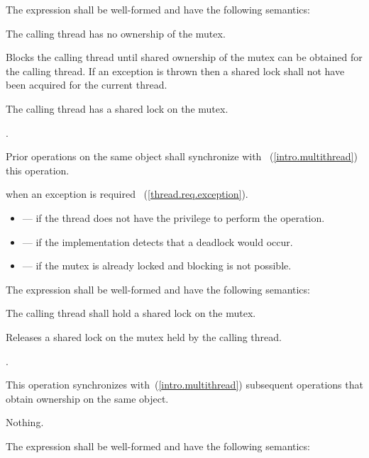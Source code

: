 \pnum
The expression  shall be well-formed and have the
following semantics:

\begin{itemdescr}
\pnum
\requires The calling thread has no ownership of the mutex.

\pnum
\effects Blocks the calling thread until shared ownership of the mutex can be obtained for the calling thread.
If an exception is thrown then a shared lock shall not have been acquired for the current thread.

\pnum
\postcondition The calling thread has a shared lock on the mutex.

\pnum
\returntype {}.

\pnum
\sync Prior  operations on the same object shall synchronize with ~(\ref{intro.multithread}) this operation.

\pnum
\throws {} when an exception is required ~(\ref{thread.req.exception}).

\pnum
\errors
\begin{itemize}
\item {} --- if the thread does not have the privilege to perform the operation.
\item {} --- if the implementation detects that a deadlock would occur.
\item {} --- if the mutex is already locked and blocking is not possible.
\end{itemize}
\end{itemdescr}

\pnum
The expression  shall be well-formed and have the following semantics:

\begin{itemdescr}
\pnum
\requires The calling thread shall hold a shared lock on the mutex.

\pnum
\effects Releases a shared lock on the mutex held by the calling thread.

\pnum
\returntype {}.

\pnum
\sync This operation synchronizes with~(\ref{intro.multithread}) subsequent
 operations that obtain ownership on the same object.

\pnum
\throws Nothing.
\end{itemdescr}

\pnum
The expression  shall be well-formed and have the following semantics:

